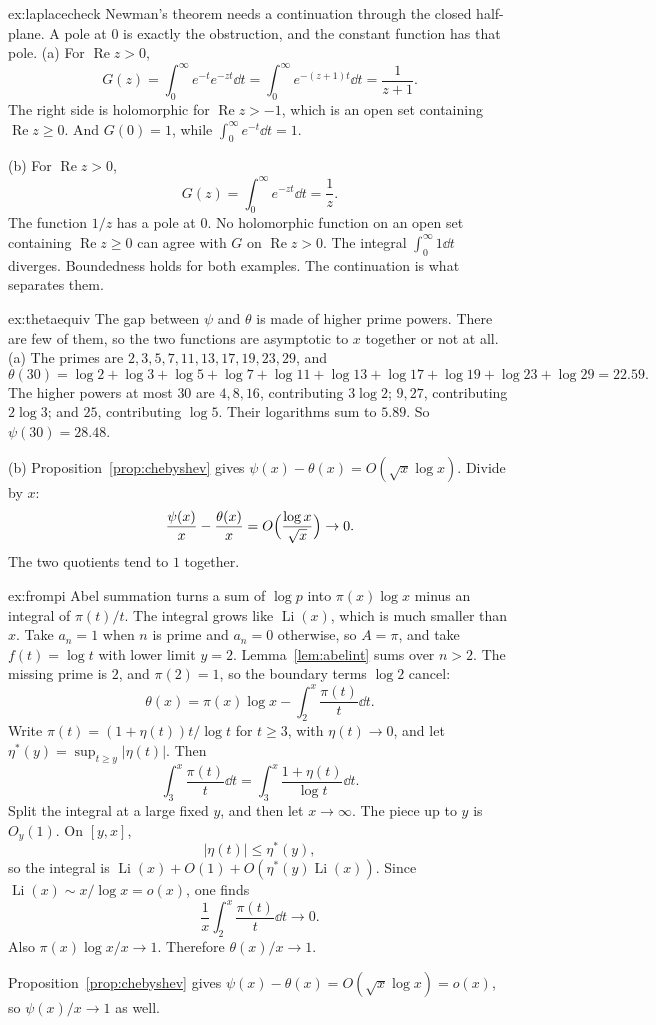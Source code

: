 \begin{solution}{ex:laplacecheck}
\idea Newman's theorem needs a continuation through the closed half-plane. A pole at $0$ is exactly the obstruction, and the constant function has that pole.
\writeup (a) For $\operatorname{Re}z>0$,
\[
G(z)=\int_0^\infty e^{-t}e^{-zt}\dd t=\int_0^\infty e^{-(z+1)t}\dd t=\frac1{z+1}.
\]
The right side is holomorphic for $\operatorname{Re}z>-1$, which is an open set containing $\operatorname{Re}z\ge0$. And $G(0)=1$, while $\int_0^\infty e^{-t}\dd t=1$.

(b) For $\operatorname{Re}z>0$,
\[
G(z)=\int_0^\infty e^{-zt}\dd t=\frac1z.
\]
The function $1/z$ has a pole at $0$. No holomorphic function on an open set containing $\operatorname{Re}z\ge0$ can agree with $G$ on $\operatorname{Re}z>0$. The integral $\int_0^\infty 1\dd t$ diverges. Boundedness holds for both examples. The continuation is what separates them.
\end{solution}

\begin{solution}{ex:thetaequiv}
\idea The gap between $\psi$ and $\theta$ is made of higher prime powers. There are few of them, so the two functions are asymptotic to $x$ together or not at all.
\writeup (a) The primes are $2,3,5,7,11,13,17,19,23,29$, and
\[
\theta(30)=\log2+\log3+\log5+\log7+\log11+\log13+\log17+\log19+\log23+\log29=22.59.
\]
The higher powers at most $30$ are $4,8,16$, contributing $3\log2$; $9,27$, contributing $2\log3$; and $25$, contributing $\log5$. Their logarithms sum to $5.89$. So $\psi(30)=28.48$.

(b) Proposition~\ref{prop:chebyshev} gives $\psi(x)-\theta(x)=O(\sqrt x\log x)$. Divide by $x$:
\[
\frac{\psi(x)}x-\frac{\theta(x)}x=O\Bigl(\frac{\log x}{\sqrt x}\Bigr)\to0.
\]
The two quotients tend to $1$ together.
\end{solution}

\begin{solution}{ex:frompi}
\idea Abel summation turns a sum of $\log p$ into $\pi(x)\log x$ minus an integral of $\pi(t)/t$. The integral grows like $\operatorname{Li}(x)$, which is much smaller than $x$.
\writeup Take $a_n=1$ when $n$ is prime and $a_n=0$ otherwise, so $A=\pi$, and take $f(t)=\log t$ with lower limit $y=2$. Lemma~\ref{lem:abelint} sums over $n>2$. The missing prime is $2$, and $\pi(2)=1$, so the boundary terms $\log2$ cancel:
\[
\theta(x)=\pi(x)\log x-\int_2^x\frac{\pi(t)}t\dd t.
\]
Write $\pi(t)=(1+\eta(t))t/\log t$ for $t\ge3$, with $\eta(t)\to0$, and let $\eta^*(y)=\sup_{t\ge y}|\eta(t)|$. Then
\[
\int_3^x\frac{\pi(t)}t\dd t=\int_3^x\frac{1+\eta(t)}{\log t}\dd t.
\]
Split the integral at a large fixed $y$, and then let $x\to\infty$. The piece up to $y$ is $O_y(1)$. On $[y,x]$,
\[
\bigl|\eta(t)\bigr|\le\eta^*(y),
\]
so the integral is $\operatorname{Li}(x)+O(1)+O(\eta^*(y)\operatorname{Li}(x))$. Since $\operatorname{Li}(x)\sim x/\log x=o(x)$, one finds
\[
\frac1x\int_2^x\frac{\pi(t)}t\dd t\to0.
\]
Also $\pi(x)\log x/x\to1$. Therefore $\theta(x)/x\to1$.

Proposition~\ref{prop:chebyshev} gives $\psi(x)-\theta(x)=O(\sqrt x\log x)=o(x)$, so $\psi(x)/x\to1$ as well.
\end{solution}

